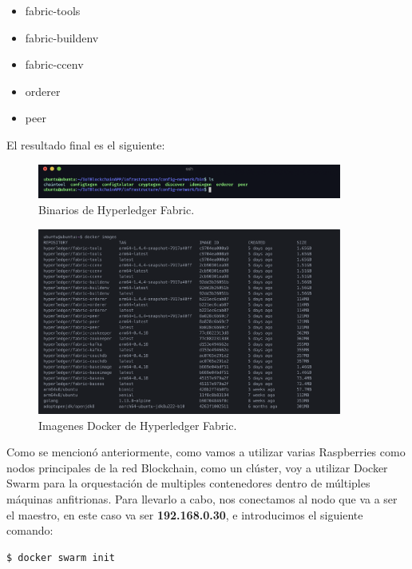 \begin{itemize}
  \item fabric-tools
  \item fabric-buildenv
  \item fabric-ccenv
  \item orderer
  \item peer
\end{itemize}

\newpage

\noindent El resultado final es el siguiente:

\begin{figure}[ht!]
  \centering
  \includegraphics[width=10cm]{imagenes/desarrollo/binarios_fabric}
  \caption{Binarios de Hyperledger Fabric.}
  \label{fig:binarios-fabric}
\end{figure}

\begin{figure}[ht!]
  \centering
  \includegraphics[width=10cm]{imagenes/desarrollo/imagenes_docker}
  \caption{Imagenes Docker de Hyperledger Fabric.}
  \label{fig:imagenes-docker}
\end{figure}

Como se mencionó anteriormente, como vamos a utilizar varias Raspberries como nodos principales de la red Blockchain, 
como un clúster, voy a utilizar Docker Swarm para la orquestación de multiples contenedores dentro de múltiples 
máquinas anfitrionas. Para llevarlo a cabo, nos conectamos al nodo que va a ser el maestro, en este caso va ser 
\textbf{192.168.0.30}, e introducimos el siguiente comando:

\begin{lstlisting}[language=bash]
  $ docker swarm init
\end{lstlisting}

